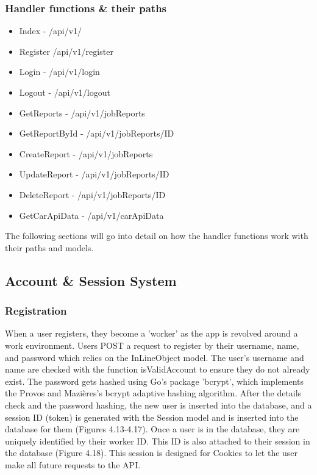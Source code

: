 \subsubsection{Handler functions \& their paths}
\begin{itemize}
    \item Index - /api/v1/
    \item Register /api/v1/register
    \item Login - /api/v1/login
     \item Logout - /api/v1/logout
    \item GetReports - /api/v1/jobReports
    \item GetReportById - /api/v1/jobReports/ID
    \item CreateReport - /api/v1/jobReports
    \item UpdateReport - /api/v1/jobReports/ID
    \item DeleteReport - /api/v1/jobReports/ID
    \item GetCarApiData - /api/v1/carApiData
\end{itemize}

The following sections will go into detail on how the handler functions work with their paths and models.

\subsection{Account \& Session System}
\subsubsection{Registration}
When a user registers, they become a 'worker' as the app is revolved around a work environment. Users POST a request to register by their username, name, and password which relies on the InLineObject model. The user's username and name are checked with the function isValidAccount to ensure they do not already exist. The password gets hashed using Go's package 'bcrypt', which implements the Provos and Mazières's bcrypt adaptive hashing algorithm. \cite{ref25} After the details check and the password hashing, the new user is inserted into the database, and a session ID (token) is generated with the Session model and is inserted into the database for them (Figures 4.13-4.17). Once a user is in the database, they are uniquely identified by their worker ID. This ID is also attached to their session in the database (Figure 4.18). This session is designed for Cookies to let the user make all future requests to the API.

